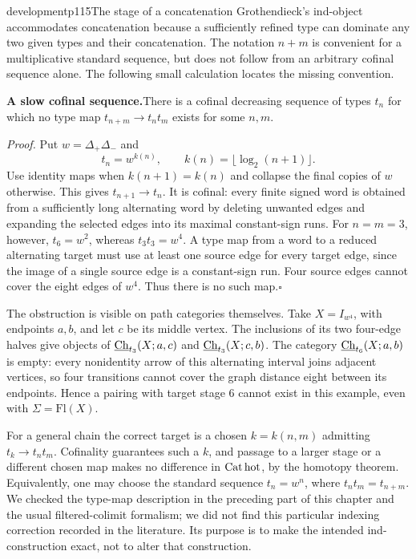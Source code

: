 \begin{dcomment}{development}{p115}{The stage of a concatenation}
Grothendieck's ind-object accommodates concatenation because a sufficiently refined type can dominate any two given types and their concatenation. The notation $n+m$ is convenient for a multiplicative standard sequence, but does not follow from an arbitrary cofinal sequence alone. The following small calculation locates the missing convention.

\textbf{A slow cofinal sequence.}\ours\quad There is a cofinal decreasing sequence of types $t_n$ for which no type map $t_{n+m}\to t_nt_m$ exists for some $n,m$.

\emph{Proof.} Put $w=\Delta_+\Delta_-$ and
\[
 t_n=w^{k(n)},\qquad k(n)=\lfloor\log_2(n+1)\rfloor.
\]
Use identity maps when $k(n+1)=k(n)$ and collapse the final copies of $w$ otherwise. This gives $t_{n+1}\to t_n$. It is cofinal: every finite signed word is obtained from a sufficiently long alternating word by deleting unwanted edges and expanding the selected edges into its maximal constant-sign runs. For $n=m=3$, however, $t_6=w^2$, whereas $t_3t_3=w^4$. A type map from a word to a reduced alternating target must use at least one source edge for every target edge, since the image of a single source edge is a constant-sign run. Four source edges cannot cover the eight edges of $w^4$. Thus there is no such map.\hfill$\square$

The obstruction is visible on path categories themselves. Take $X=I_{w^4}$, with endpoints $a,b$, and let $c$ be its middle vertex. The inclusions of its two four-edge halves give objects of $\underline{\mathrm{Ch}}_{t_3}(X;a,c)$ and $\underline{\mathrm{Ch}}_{t_3}(X;c,b)$. The category $\underline{\mathrm{Ch}}_{t_6}(X;a,b)$ is empty: every nonidentity arrow of this alternating interval joins adjacent vertices, so four transitions cannot cover the graph distance eight between its endpoints. Hence a pairing with target stage $6$ cannot exist in this example, even with $\Sigma=\mathrm{Fl}(X)$.

For a general chain the correct target is a chosen $k=k(n,m)$ admitting $t_k\to t_nt_m$. Cofinality guarantees such a $k$, and passage to a larger stage or a different chosen map makes no difference in $\mathrm{Cat\,hot}$, by the homotopy theorem. Equivalently, one may choose the standard sequence $t_n=w^n$, where $t_nt_m=t_{n+m}$. We checked the type-map description in the preceding part of this chapter and the usual filtered-colimit formalism; we did not find this particular indexing correction recorded in the literature. Its purpose is to make the intended ind-construction exact, not to alter that construction.
\end{dcomment}


